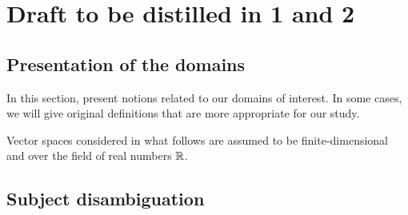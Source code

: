 \setcounter{chapter}{-1}
\chapter{Draft to be distilled in 1 and 2}

\minitoc
\newpage

\section{Presentation of the domains}

In this section, present notions related to our domains of interest. In some cases, we will give original definitions that are more appropriate for our study.

Vector spaces considered in what follows are assumed to be finite-dimensional and over the field of real numbers $\mathbb{R}$.


\newpage

\newpage

\newpage

\section{Subject disambiguation}


\newpage